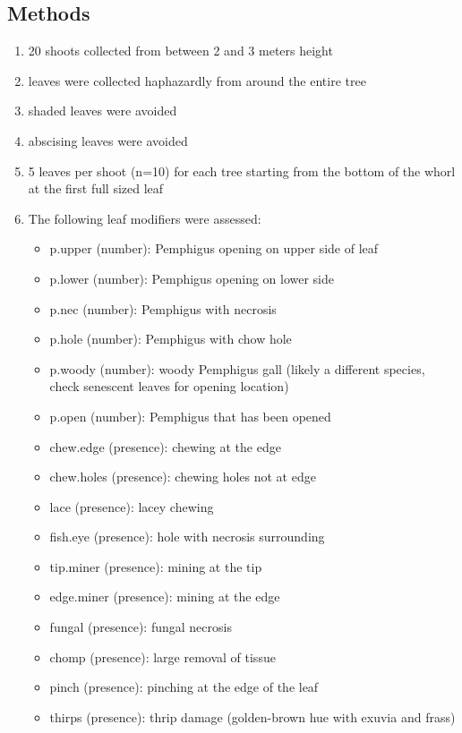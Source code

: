 \documentclass[12pt]{article}
\begin{document}
\subsection{Methods}
\begin{enumerate}
\item 20 shoots collected from between 2 and 3 meters height
\item leaves were collected haphazardly from around the entire tree
\item shaded leaves were avoided
\item abscising leaves were avoided
\item 5 leaves per shoot (n=10) for each tree starting from the bottom of the whorl at the first full sized leaf
\item The following leaf modifiers were assessed:
  \begin{itemize}
  \item p.upper (number): Pemphigus opening on upper side of leaf
  \item p.lower (number): Pemphigus opening on lower side
  \item p.nec (number): Pemphigus with necrosis
  \item p.hole (number): Pemphigus with chow hole
  \item p.woody (number): woody Pemphigus gall (likely a different
    species, check senescent leaves for opening location)
  \item p.open (number): Pemphigus that has been opened
  \item chew.edge (presence): chewing at the edge
  \item chew.holes (presence): chewing holes not at edge
  \item lace (presence): lacey chewing
  \item fish.eye (presence): hole with necrosis surrounding
  \item tip.miner (presence): mining at the tip
  \item edge.miner (presence): mining at the edge
  \item fungal (presence): fungal necrosis
  \item chomp (presence): large removal of tissue
  \item pinch (presence): pinching at the edge of the leaf
  \item thirps (presence): thrip damage (golden-brown hue with exuvia and frass)
  \end{itemize}
\end{enumerate}



\end{document}
